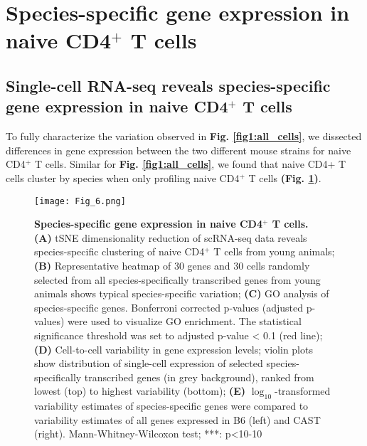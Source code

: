 \newpage

\section{Species-specific gene expression in naive CD4$^+$ T cells}
\subsection*{Single-cell RNA-seq reveals species-specific gene expression in naive CD4$^+$ T cells}

To fully characterize the variation observed in \textbf{Fig. \ref{fig1:all_cells}}, we dissected differences in gene expression between the two different mouse strains for naive CD4$^+$ T cells. Similar for \textbf{Fig. \ref{fig1:all_cells}}, we found that naive CD4+ T cells cluster by species when only profiling naive CD4$^+$ T cells \textbf{(Fig. \ref{fig1:species_specific})}.

\begin{figure}[!h]
\centering
\texttt{[image: Fig\_6.png]}
\caption[Species-specific gene expression in naive CD4$^+$ T cells]{\textbf{Species-specific gene expression in naive CD4$^+$ T cells.}\\
\textbf{(A)} tSNE dimensionality reduction of scRNA-seq data reveals species-specific clustering of naive CD4$^+$ T cells from young animals; \textbf{(B)} Representative heatmap of 30 genes and 30 cells randomly selected from all species-specifically transcribed genes from young animals shows typical species-specific variation; \textbf{(C)}  GO analysis of species-specific genes. Bonferroni corrected p-values (adjusted p-values) were used to visualize GO enrichment. The statistical significance threshold was set to adjusted p-value < 0.1 (red line); \textbf{(D)} Cell-to-cell variability in gene expression levels; violin plots show distribution of single-cell expression of selected species-specifically transcribed genes (in grey background), ranked from lowest (top) to highest variability (bottom); \textbf{(E)} $\log_10$-transformed variability estimates of species-specific genes were compared to variability estimates of all genes expressed in B6 (left) and CAST (right). Mann-Whitney-Wilcoxon test; ***: p<10-10}
\label{fig1:species_specific}
\end{figure}

\newpage

